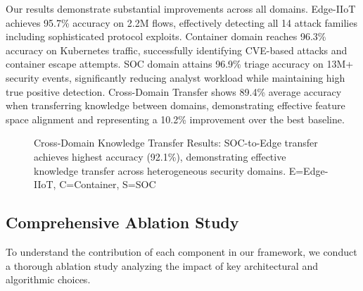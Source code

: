 \documentclass[12pt,a4paper]{article}
\theoremstyle{definition}
\begin{document}
Our results demonstrate substantial improvements across all domains. Edge-IIoT achieves 95.7\% accuracy on 2.2M flows, effectively detecting all 14 attack families including sophisticated protocol exploits. Container domain reaches 96.3\% accuracy on Kubernetes traffic, successfully identifying CVE-based attacks and container escape attempts. SOC domain attains 96.9\% triage accuracy on 13M+ security events, significantly reducing analyst workload while maintaining high true positive detection. Cross-Domain Transfer shows 89.4\% average accuracy when transferring knowledge between domains, demonstrating effective feature space alignment and representing a 10.2\% improvement over the best baseline.

\begin{figure}[H]
\centering
{}
\caption{Cross-Domain Knowledge Transfer Results: SOC-to-Edge transfer achieves highest accuracy (92.1\%), demonstrating effective knowledge transfer across heterogeneous security domains. E=Edge-IIoT, C=Container, S=SOC}
\label{fig:transfer_effectiveness}
\end{figure}

\subsection{Comprehensive Ablation Study}

To understand the contribution of each component in our framework, we conduct a thorough ablation study analyzing the impact of key architectural and algorithmic choices.
\end{document}
